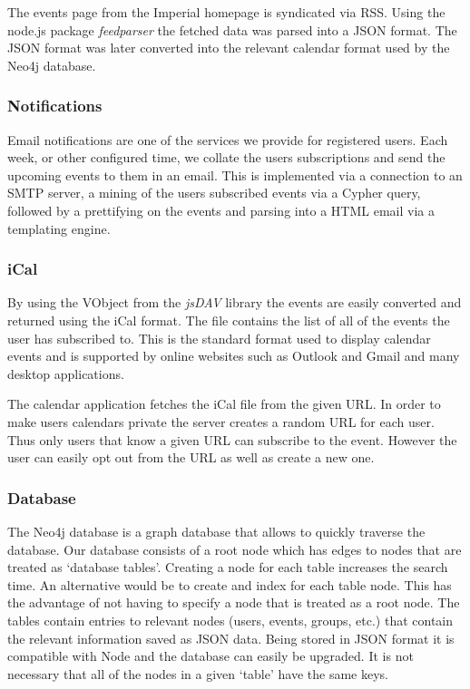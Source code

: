 \documentclass[11pt]{article}
\begin{document}
The events page from the Imperial homepage is syndicated via RSS. Using the node.js package \textit{feedparser} the fetched data was parsed into a JSON format. The JSON format was later converted into the relevant calendar format used by the Neo4j database.

\subsubsection{Notifications}
Email notifications are one of the services we provide for registered users. Each week, or other configured time, we collate the users subscriptions and send the upcoming events to them in an email. This is implemented via a connection to an SMTP server, a mining of the users subscribed events via a Cypher query, followed by a prettifying on the events and parsing into a HTML email via a templating engine.

\subsubsection{iCal}

By using the VObject from the \textit{jsDAV} library the events are easily converted and returned using the iCal format. The file contains the list of all of the events the user has subscribed to. This is the standard format used to display calendar events and is supported by online websites such as Outlook and Gmail and many desktop applications.

The calendar application fetches the iCal file from the given URL. In order to make users calendars private the server creates a random URL for each user. Thus only users that know a given URL can subscribe to the event. However the user can easily opt out from the URL as well as create a new one.

\subsubsection{Database}

The Neo4j database is a graph database that allows to quickly traverse the database.
Our database consists of a root node which has edges to nodes that are treated as `database tables'.
Creating a node for each table increases the search time. An alternative would be to create and index for each table node. This has the advantage of not having to specify a node that is treated as a root node.
The tables contain entries to relevant nodes (users, events, groups, etc.) that contain the relevant information saved as JSON data. Being stored in JSON format it is compatible with Node and the database can easily be upgraded. It is not necessary that all of the nodes in a given `table' have the same keys.
\end{document}
